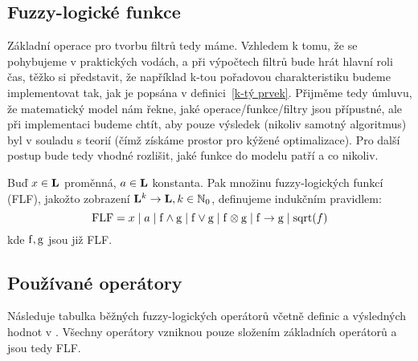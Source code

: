     \subsection{Fuzzy-logické funkce}

    Základní operace pro tvorbu filtrů tedy máme. Vzhledem k tomu, že se pohybujeme v praktických vodách, a při výpočtech filtrů bude hrát hlavní roli čas, těžko si představit, že například k-tou pořadovou charakteristiku budeme implementovat tak, jak je popsána v definici~\ref{k-tý prvek}. Přijměme tedy úmluvu, že matematický model nám řekne, jaké operace/funkce/filtry jsou přípustné, ale při implementaci budeme chtít, aby pouze výsledek (nikoliv samotný algoritmus) byl v souladu s teorií (čímž získáme prostor pro kýžené optimalizace). Pro další postup bude tedy vhodné rozlišit, jaké funkce do modelu patří a co nikoliv.

    \begin{define}\label{def FLF}
    Buď $x \in \mathbf{L}$ proměnná, $a \in \mathbf{L}$ konstanta. Pak množinu fuzzy-logických funkcí \textup{(FLF)}, jakožto zobrazení $\mathbf{L}^k \rightarrow \mathbf{L}, k \in \mathbb{N}_0$, definujeme indukčním pravidlem:
    \[
    \mathrm{FLF} = x \mid a \mid \mathrm{f} \wedge \mathrm{g} \mid \mathrm{f} \vee \mathrm{g} \mid \mathrm{f} \otimes \mathrm{g} \mid \mathrm{f} \rightarrow \mathrm{g} \mid \mathrm{sqrt}(f)
    \]
    kde $\mathrm{f},\mathrm{g}$ jsou již \textup{FLF}.
    \end{define}

    \subsection{Používané operátory}\label{operátory}

    Následuje tabulka běžných fuzzy-logických operátorů včetně definic a výsledných hodnot v \LAsq. Všechny operátory vzniknou pouze složením základních operátorů a jsou tedy FLF.

